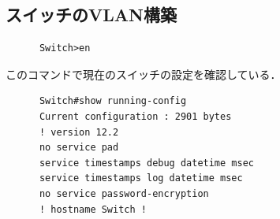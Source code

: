\documentclass{jlreq}
\begin{document}
      \subsection{スイッチのVLAN構築}
      \begin{lstlisting}
      Switch>en
      \end{lstlisting}

      このコマンドで現在のスイッチの設定を確認している．
      \begin{lstlisting}
      Switch#show running-config 
      Current configuration : 2901 bytes
      ! version 12.2
      no service pad
      service timestamps debug datetime msec
      service timestamps log datetime msec
      no service password-encryption
      ! hostname Switch !
      \end{lstlisting}
\end{document}

